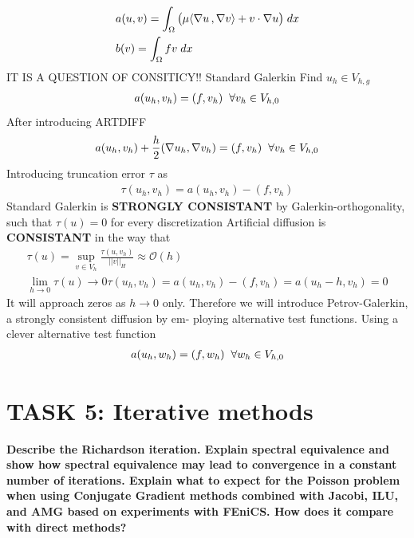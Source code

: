 \documentclass[a4paper,norsk]{article}
\begin{document}
\begin{align*}
&a(u, v) = \int_{\Omega} \big( \mu \inner[\nabla u]{\nabla v} + v \cdot \nabla u \big) \hspace{1mm} dx \\
&b(v) = \int_\Omega f v \hspace{1mm} dx
\end{align*}
IT IS A QUESTION OF CONSITICY!! \newline
Standard Galerkin
Find $u_h \in V_{h, g}$
\begin{align*}
a(u_h, v_h) = (f, v_h) \hspace{2mm} \forall v_h \in V_{h, 0}
\end{align*}
After introducing ARTDIFF
\begin{align*}
a(u_h, v_h) + \frac{h}{2} (\nabla u_h, \nabla v_h) = (f, v_h) \hspace{2mm} \forall v_h \in V_{h, 0}
\end{align*}
Introducing truncation error $\tau$ as 
\begin{align*}
\tau(u_h, v_h) = a(u_h, v_h) - (f, v_h) 
\end{align*} 
Standard Galerkin is \textbf{STRONGLY CONSISTANT} by Galerkin-orthogonality, such that $\tau(u) = 0$ for every discretization \newline
Artificial diffusion is \textbf{CONSISTANT} in the way that 
\begin{align*}
\tau(u) = \sup_{v \in V_h} \frac{\tau(u, v_h)}{||v||_H} \approx \mathcal{O}(h) \\
\lim_{h \to 0} \tau(u) \rightarrow 0
\tau(u_h, v_h) = a(u_h, v_h) - (f, v_h) = a(u_h - h, v_h) = 0 
\end{align*}
It will approach zeros as $h \rightarrow 0$ only.
Therefore we will introduce Petrov-Galerkin, a strongly consistent diffusion by em-
ploying alternative test functions. Using a clever alternative test function
\begin{align*}
a(u_h, w_h) = (f, w_h) \hspace{2mm} \forall w_h \in V_{h, 0}
\end{align*}

\newpage
\section*{TASK 5: Iterative methods}
\textbf{Describe the Richardson iteration.  Explain spectral equivalence and show
how spectral equivalence may lead to convergence in a constant number of
iterations.   Explain  what  to  expect  for  the  Poisson  problem  when  using
Conjugate Gradient methods combined with Jacobi, ILU, and AMG based
on experiments with FEniCS. How does it compare with direct methods?}
\end{document}
